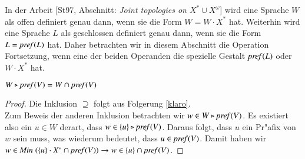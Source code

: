 


In der Arbeit [St97, Abschnitt: \emph{Joint topologies on $X^*\cup X^\omega$}] wird eine Sprache $W$ als offen definiert genau dann, wenn sie die Form $W=W\cdot X^*$ hat. Weiterhin wird eine Sprache $L$ als geschlossen definiert genau dann, wenn sie die Form $L=\mathit{pref{(}}L)$ hat. 
Daher betrachten wir in diesem Abschnitt die Operation Fortsetzung, wenn eine der beiden Operanden die spezielle Gestalt $\mathit{pref{(}}L)$ oder $W\cdot X^*$ hat. 

\vspace{2ex}

\begin{eigen}\label{spezeig1}
$W\triangleright \mathit{pref{(}}V) = W \cap \mathit{pref{(}}V)$
\end{eigen}
\begin{proof}
Die Inklusion $\supseteq$ folgt aus Folgerung \ref{klaro}.\\
Zum Beweis der anderen Inklusion betrachten wir $w\in W\triangleright\mathit{pref{(}}V)$. Es existiert also ein $u\in W$ derart, dass $w\in \{u\}\triangleright\mathit{pref{(}}V)$. Daraus folgt, dass $u$ ein Pr"afix von $w$ sein muss, was wiederum bedeutet, dass $u\in\mathit{pref{(}}V)$. Damit haben wir $w\in\mathit{Min}\;(\{u\}\cdot X^*\cap \mathit{pref{(}}V)) \to w\in \{u\}\cap \mathit{pref{(}}V)$.
\end{proof}


